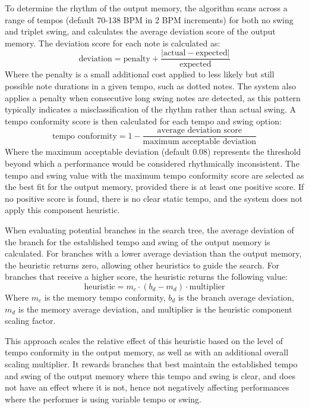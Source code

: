 To determine the rhythm of the output memory, the algorithm scans across a range of tempos (default 70-138 BPM in 2 BPM increments) for both no swing and triplet swing, and calculates the average deviation score of the output memory. The deviation score for each note is calculated as:
\begin{equation}
    \text{deviation} = \text{penalty} + \frac{|\text{actual} - \text{expected}|}{\text{expected}}
\end{equation}
Where the penalty is a small additional cost applied to less likely but still possible note durations in a given tempo, such as dotted notes. The system also applies a penalty when consecutive long swing notes are detected, as this pattern typically indicates a misclassification of the rhythm rather than actual swing. A tempo conformity score is then calculated for each tempo and swing option:
\begin{equation}
    \text{tempo conformity} = 1 - \frac{\text{average deviation score}}{\text{maximum acceptable deviation}}
\end{equation}
Where the maximum acceptable deviation (default 0.08) represents the threshold beyond which a performance would be considered rhythmically inconsistent. The tempo and swing value with the maximum tempo conformity score are selected as the best fit for the output memory, provided there is at least one positive score. If no positive score is found, there is no clear static tempo, and the system does not apply this component heuristic.

When evaluating potential branches in the search tree, the average deviation of the branch for the established tempo and swing of the output memory is calculated. For branches with a lower average deviation than the output memory, the heuristic returns zero, allowing other heuristics to guide the search. For branches that receive a higher score, the heuristic returns the following value:
\begin{equation}
    \text{heuristic} = m_c \cdot (b_d - m_d) \cdot \text{multiplier}
\end{equation}
Where $m_c$ is the memory tempo conformity, $b_d$ is the branch average deviation, $m_d$ is the memory average deviation, and multiplier is the heuristic component scaling factor.

This approach scales the relative effect of this heuristic based on the level of tempo conformity in the output memory, as well as with an additional overall scaling multiplier. It rewards branches that best maintain the established tempo and swing of the output memory where this tempo and swing is clear, and does not have an effect where it is not, hence not negatively affecting performances where the performer is using variable tempo or swing.

